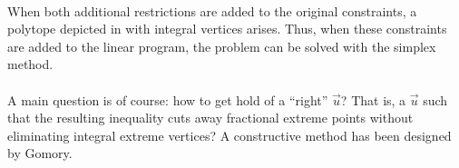 \begin{example}
\paragraph{}
When both additional restrictions are added to the original constraints, a polytope depicted in  with integral vertices arises. Thus, when these constraints are added to the linear program, the problem can be solved with the simplex method.

\end{example}

\paragraph{}
A main question is of course: how to get hold of a ``right'' $\vec{u}$? That is, a $\vec{u}$ such that the resulting inequality cuts away fractional extreme points without eliminating integral extreme vertices? A constructive method has been designed by Gomory.

